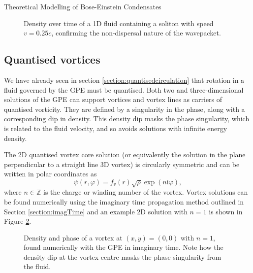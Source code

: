 \begin{chapter}{\label{cha:theoretical_model}Theoretical Modelling of Bose-Einstein Condensates}
\begin{figure}[!ht]
  \caption{Density over time of a 1D fluid containing a soliton with speed $v=0.25c$, confirming the non-dispersal nature of the wavepacket.}\label{fig_solitonmove}
 \end{figure}


\subsection{\label{section:vortices} Quantised vortices}
We have already seen in section \ref{section:quantisedcirculation} that rotation in a fluid governed by the GPE must be quantised. Both two and three-dimensional solutions of the GPE can support vortices and vortex lines as carriers of quantised vorticity. They are defined by a singularity in the phase, along with a corresponding dip in density. This density dip masks the phase singularity, which is related to the fluid velocity, and so avoids solutions with infinite energy density.

The 2D quantised vortex core solution (or equivalently the solution in the plane perpendicular to a straight line 3D vortex) is circularly symmetric and can be written in polar coordinates as
	\begin{equation}\label{eq_vortexsol}
	\psi(r,\varphi) = f_v(r)\sqrt{\rho}\exp(n\mathrm{i}\varphi),
	\end{equation}
where $n\in\mathbb{Z}$ is the charge or winding number of the vortex. Vortex solutions can be found numerically using the imaginary time propagation method outlined in Section \ref{section:imagTime} and an example 2D solution with $n=1$ is shown in Figure \ref{fig_vortexdensphase}.

\begin{figure}[!ht]
	\centering
  \caption{Density and phase of a vortex at $(x,y) = (0,0)$ with $n=1$, found numerically with the GPE in imaginary time. Note how the density dip at the vortex centre masks the phase singularity from the fluid. }\label{fig_vortexdensphase}
 \end{figure}


\end{chapter}
